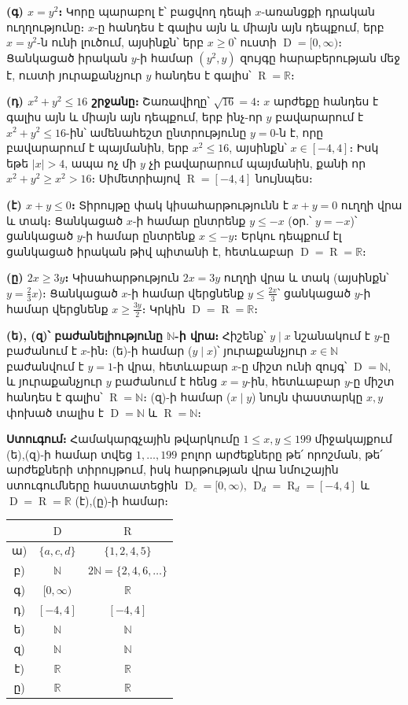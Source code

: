\documentclass[11pt,a4paper]{article}
\newcommand{\R}{\mathbb{R}}
\newcommand{\N}{\mathbb{N}}
\DeclareMathOperator{\Dom}{D}
\DeclareMathOperator{\Ran}{R}
\begin{document}
\textbf{(գ) $x=y^2$։} Կորը պարաբոլ է՝ բացվող դեպի $x$-առանցքի դրական ուղղությունը։ $x$-ը հանդես է գալիս
այն և միայն այն դեպքում, երբ $x=y^2$-ն ունի լուծում, այսինքն՝ երբ $x\ge0$՝ ուստի $\Dom=[0,\infty)$։
Ցանկացած իրական $y$-ի համար $(y^2,y)$ զույգը հարաբերության մեջ է, ուստի յուրաքանչյուր $y$ հանդես է գալիս՝
$\Ran=\R$։

\textbf{(դ) $x^2+y^2\le16$ շրջանը։} Շառավիղը՝ $\sqrt{16}=4$։ $x$ արժեքը հանդես է գալիս այն և միայն այն
դեպքում, երբ ինչ-որ $y$ բավարարում է $x^2+y^2\le16$-ին՝ ամենահեշտ ընտրությունը $y=0$-ն է, որը բավարարում
է պայմանին, երբ $x^2\le16$, այսինքն՝ $x\in[-4,4]$։ Իսկ եթե $|x|>4$, ապա ոչ մի $y$ չի բավարարում պայմանին, քանի որ
$x^2+y^2\ge x^2>16$։ Սիմետրիայով $\Ran=[-4,4]$ նույնպես։

\textbf{(է) $x+y\le0$։} Տիրույթը փակ կիսահարթությունն է $x+y=0$ ուղղի վրա և տակ։ Ցանկացած $x$-ի համար
ընտրենք $y\le-x$ (օր.՝ $y=-x$)՝ ցանկացած $y$-ի համար ընտրենք $x\le-y$։ Երկու դեպքում էլ ցանկացած
իրական թիվ պիտանի է, հետևաբար $\Dom=\Ran=\R$։

\textbf{(ը) $2x\ge3y$։} Կիսահարթություն $2x=3y$ ուղղի վրա և տակ (այսինքն՝ $y=\tfrac23 x$)։ Ցանկացած $x$-ի
համար վերցնենք $y\le\tfrac{2x}{3}$՝ ցանկացած $y$-ի համար վերցնենք $x\ge\tfrac{3y}{2}$։ Կրկին
$\Dom=\Ran=\R$։

\textbf{(ե), (զ)՝ բաժանելիությունը $\N$-ի վրա։} Հիշենք՝ $y\mid x$ նշանակում է $y$-ը բաժանում է $x$-ին։
(ե)-ի համար ($y\mid x$)՝ յուրաքանչյուր $x\in\N$ բաժանվում է $y=1$-ի վրա, հետևաբար $x$-ը միշտ ունի
զույգ՝ $\Dom=\N$, և յուրաքանչյուր $y$ բաժանում է հենց $x=y$-ին, հետևաբար $y$-ը միշտ հանդես է գալիս՝
$\Ran=\N$։ (զ)-ի համար ($x\mid y$) նույն փաստարկը $x,y$ փոխած տալիս է $\Dom=\N$ և $\Ran=\N$։

\textbf{Ստուգում։} Համակարգչային թվարկումը $1\le x,y\le199$ միջակայքում (ե),(զ)-ի համար տվեց
$1,\dots,199$ բոլոր արժեքները թե՛ որոշման, թե՛ արժեքների տիրույթում, իսկ հարթության վրա նմուշային
ստուգումները հաստատեցին $\Dom_c=[0,\infty)$, $\Dom_d=\Ran_d=[-4,4]$ և $\Dom=\Ran=\R$ (է),(ը)-ի համար։ \checkmark

\begin{center}
\renewcommand{\arraystretch}{1.2}
\begin{tabular}{@{}c|cc@{}}
\toprule
 & $\Dom$ & $\Ran$\\
\midrule
ա) & $\{a,c,d\}$ & $\{1,2,4,5\}$\\
բ) & $\N$ & $2\N=\{2,4,6,\dots\}$\\
գ) & $[0,\infty)$ & $\R$\\
դ) & $[-4,4]$ & $[-4,4]$\\
ե) & $\N$ & $\N$\\
զ) & $\N$ & $\N$\\
է) & $\R$ & $\R$\\
ը) & $\R$ & $\R$\\
\bottomrule
\end{tabular}
\end{center}
\end{document}
